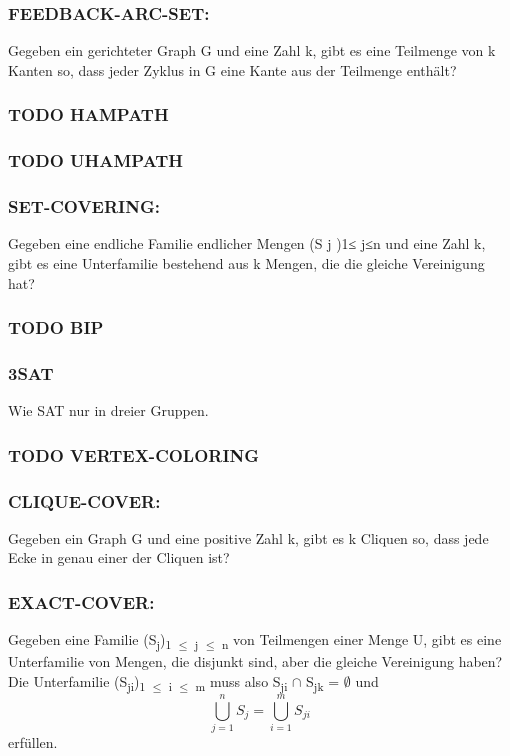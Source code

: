 \documentclass[11pt,twoside,landscape]{article}
\begin{document}
\begin{multicols}{3}
\subsubsection*{FEEDBACK-ARC-SET:}
\label{sec:orgf3e9d21}
Gegeben ein gerichteter Graph G und eine Zahl k, gibt es eine Teilmenge von k Kanten so, dass jeder Zyklus in G eine Kante aus der Teilmenge enthält?

\subsubsection*{{\bfseries\sffamily TODO} HAMPATH}
\label{sec:orgda5bf66}
\subsubsection*{{\bfseries\sffamily TODO} UHAMPATH}
\label{sec:org24b98c6}
\subsubsection*{SET-COVERING:}
\label{sec:org6a5f704}
Gegeben eine endliche Familie endlicher Mengen (S j )1≤ j≤n und eine Zahl k, gibt es eine Unterfamilie bestehend aus k Mengen, die die gleiche Vereinigung hat?


\subsubsection*{{\bfseries\sffamily TODO} BIP}
\label{sec:orgb46c63b}

\subsubsection*{3SAT}
\label{sec:orgd5fbb64}
Wie SAT nur in dreier Gruppen.
\subsubsection*{{\bfseries\sffamily TODO} VERTEX-COLORING}
\label{sec:org4f83da7}
\subsubsection*{CLIQUE-COVER:}
\label{sec:orgb53b067}
Gegeben ein Graph G und eine positive Zahl k, gibt es k Cliquen so, dass jede Ecke in genau einer der Cliquen ist?

\subsubsection*{EXACT-COVER:}
\label{sec:org1db71d1}
Gegeben eine Familie (S\textsubscript{j})\textsubscript{1 \(\le\) j \(\le\) n} von Teilmengen einer Menge U, gibt es eine Unterfamilie von Mengen, die disjunkt sind, aber die gleiche Vereinigung haben? Die Unterfamilie (S\textsubscript{ji})\textsubscript{1 \(\le\) i \(\le\) m} muss also S\textsubscript{ji} \(\cap\) S\textsubscript{jk} = \(\emptyset\) und
$$
\bigcup^n_{j=1} S_j = \bigcup^m_{i=1} S_{ji}
$$
erfüllen.


\end{multicols}
\end{document}
